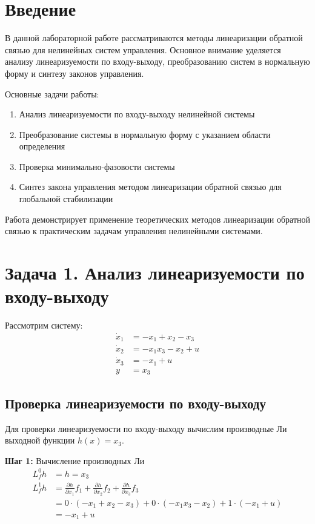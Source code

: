 \section*{Введение}

В данной лабораторной работе рассматриваются методы линеаризации обратной связью для нелинейных систем управления. Основное внимание уделяется анализу линеаризуемости по входу-выходу, преобразованию систем в нормальную форму и синтезу законов управления.

Основные задачи работы:
\begin{enumerate}
\item Анализ линеаризуемости по входу-выходу нелинейной системы
\item Преобразование системы в нормальную форму с указанием области определения
\item Проверка минимально-фазовости системы
\item Синтез закона управления методом линеаризации обратной связью для глобальной стабилизации
\end{enumerate}

Работа демонстрирует применение теоретических методов линеаризации обратной связью к практическим задачам управления нелинейными системами.

\section*{Задача 1. Анализ линеаризуемости по входу-выходу}

Рассмотрим систему:
\begin{align}
\dot{x}_1 &= -x_1 + x_2 - x_3 \\
\dot{x}_2 &= -x_1 x_3 - x_2 + u \\
\dot{x}_3 &= -x_1 + u \\
y &= x_3
\end{align}

\subsection*{Проверка линеаризуемости по входу-выходу}

Для проверки линеаризуемости по входу-выходу вычислим производные Ли выходной функции $h(x) = x_3$.

\textbf{Шаг 1:} Вычисление производных Ли
\begin{align}
L_f^0 h &= h = x_3 \\
L_f^1 h &= \frac{\partial h}{\partial x_1} f_1 + \frac{\partial h}{\partial x_2} f_2 + \frac{\partial h}{\partial x_3} f_3 \\
&= 0 \cdot (-x_1 + x_2 - x_3) + 0 \cdot (-x_1 x_3 - x_2) + 1 \cdot (-x_1 + u) \\
&= -x_1 + u
\end{align}

